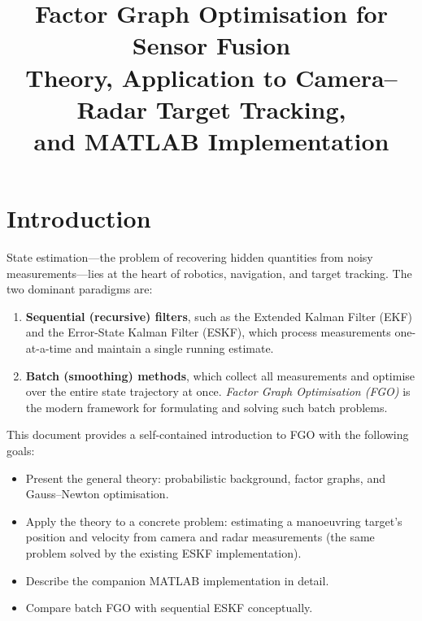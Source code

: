 \documentclass[11pt,a4paper]{article}
\title{\textbf{Factor Graph Optimisation for Sensor Fusion} \\[6pt]
       \large Theory, Application to Camera--Radar Target Tracking,\\
       and MATLAB Implementation}
\author{}
\date{}
\begin{document}
\maketitle

\tableofcontents
\newpage

\section{Introduction}
\label{sec:intro}

State estimation---the problem of recovering hidden quantities from noisy
measurements---lies at the heart of robotics, navigation, and target
tracking.  The two dominant paradigms are:

\begin{enumerate}
  \item \textbf{Sequential (recursive) filters}, such as the Extended
        Kalman Filter (EKF) and the Error-State Kalman Filter (ESKF),
        which process measurements one-at-a-time and maintain a single
        running estimate.
  \item \textbf{Batch (smoothing) methods}, which collect all
        measurements and optimise over the entire state trajectory at
        once.  \emph{Factor Graph Optimisation (FGO)} is the modern
        framework for formulating and solving such batch problems.
\end{enumerate}

This document provides a self-contained introduction to FGO with the
following goals:
\begin{itemize}[nosep]
  \item Present the general theory: probabilistic background, factor
        graphs, and Gauss--Newton optimisation.
  \item Apply the theory to a concrete problem: estimating a
        manoeuvring target's position and velocity from camera and radar
        measurements (the same problem solved by the existing ESKF
        implementation).
  \item Describe the companion MATLAB implementation in detail.
  \item Compare batch FGO with sequential ESKF conceptually.
\end{itemize}
\end{document}
